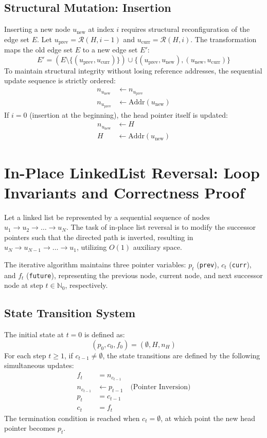 \documentclass[10pt,journal,compsoc]{IEEEtran}
\begin{document}
\subsection{Structural Mutation: Insertion}
Inserting a new node $u_{\text{new}}$ at index $i$ requires structural reconfiguration of the edge set $E$. Let $u_{\text{prev}} = \mathcal{R}(H, i-1)$ and $u_{\text{curr}} = \mathcal{R}(H, i)$. The transformation maps the old edge set $E$ to a new edge set $E'$:
\[ E' = (E \setminus \{(u_{\text{prev}}, u_{\text{curr}})\}) \cup \{(u_{\text{prev}}, u_{\text{new}}), (u_{\text{new}}, u_{\text{curr}})\} \]
To maintain structural integrity without losing reference addresses, the sequential update sequence is strictly ordered:
\begin{align*}
n_{u_{\text{new}}} &\leftarrow n_{u_{\text{prev}}} \\
n_{u_{\text{prev}}} &\leftarrow \text{Addr}(u_{\text{new}})
\end{align*}
If $i=0$ (insertion at the beginning), the head pointer itself is updated:
\begin{align*}
n_{u_{\text{new}}} &\leftarrow H \\
H &\leftarrow \text{Addr}(u_{\text{new}})
\end{align*}

\section{In-Place LinkedList Reversal: Loop Invariants and Correctness Proof}
Let a linked list be represented by a sequential sequence of nodes $u_1 \to u_2 \to \dots \to u_N$. The task of in-place list reversal is to modify the successor pointers such that the directed path is inverted, resulting in $u_N \to u_{N-1} \to \dots \to u_1$, utilizing $O(1)$ auxiliary space.

The iterative algorithm maintains three pointer variables: $p_t$ (\texttt{prev}), $c_t$ (\texttt{curr}), and $f_t$ (\texttt{future}), representing the previous node, current node, and next successor node at step $t \in \mathbb{N}_0$, respectively.

\subsection{State Transition System}
The initial state at $t=0$ is defined as:
\[ (p_0, c_0, f_0) = (\emptyset, H, n_H) \]
For each step $t \ge 1$, if $c_{t-1} \neq \emptyset$, the state transitions are defined by the following simultaneous updates:
\begin{align*}
f_t & = n_{c_{t-1}} \\
n_{c_{t-1}} & \leftarrow p_{t-1} \quad \text{(Pointer Inversion)} \\
p_t & = c_{t-1} \\
c_t & = f_t
\end{align*}
The termination condition is reached when $c_t = \emptyset$, at which point the new head pointer becomes $p_t$.
\end{document}
